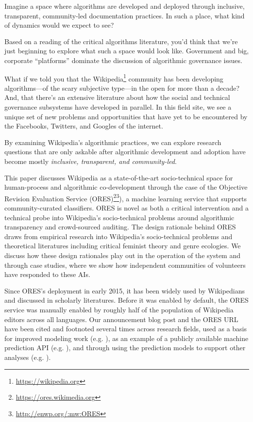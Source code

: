
Imagine a space where algorithms are developed and deployed through inclusive, transparent, community-led documentation practices.  In such a place, what kind of dynamics would we expect to see?

Based on a reading of the critical algorithms literature, you'd think that we're just beginning to explore what such a space would look like.  Government and big, corporate ``platforms'' dominate the discussion of algorithmic governance issues\cite{crawford2016algorithm}\cite{diakopoulos2015algorithmic}\cite{gillespie2014relevance}\cite{tufekci2015algorithms}.

What if we told you that the Wikipedia\footnote{\url{https://wikipedia.org}} community has been developing algorithms---of the scary subjective type---in the open for more than a decade?  And, that there's an extensive literature about how the social and technical governance subsystems have developed in parallel.  In this field site, we see a unique set of new problems and opportunities that have yet to be encountered by the Facebooks, Twitters, and Googles of the internet.

By examining Wikipedia's algorithmic practices, we can explore research questions that are only askable after algorithmic development and adoption have become mostly \emph{inclusive, transparent, and community-led}.

This paper discusses Wikipedia as a state-of-the-art socio-technical space for human-process and algorithmic co-development through the case of the Objective Revision Evaluation Service (ORES)\footnote{\url{https://ores.wikimedia.org}}\footnote{\url{http://enwp.org/:mw:ORES}}), a machine learning service that supports community-curated classifiers.  ORES is novel as both a critical intervention and a technical probe\cite{hutchinson2003technology} into Wikipedia's socio-technical problems around algorithmic transparency and crowd-sourced auditing. The design rationale behind ORES draws from empirical research into Wikipedia's socio-technical problems and theoretical literatures including critical feminist theory and genre ecologies.  We discuss how these design rationales play out in the operation of the system and through case studies, where we show how independent communities of volunteers have responded to these AIs.

Since ORES's deployment in early 2015, it has been widely used by Wikipedians and discussed in scholarly literatures.  Before it was enabled by default, the ORES service was manually enabled by roughly half of the population of Wikipedia editors across all languages.  Our announcement blog post\cite{halfaker2015artificial} and the ORES URL have been cited and footnoted several times across research fields, used as a basis for improved modeling work (e.g. \cite{dang2016quality}), as an example of a publicly available machine prediction API (e.g. \cite{lewoniewski2017relative}), and through using the prediction models to support other analyses (e.g. \cite{rezguia2017stigmergic}).

